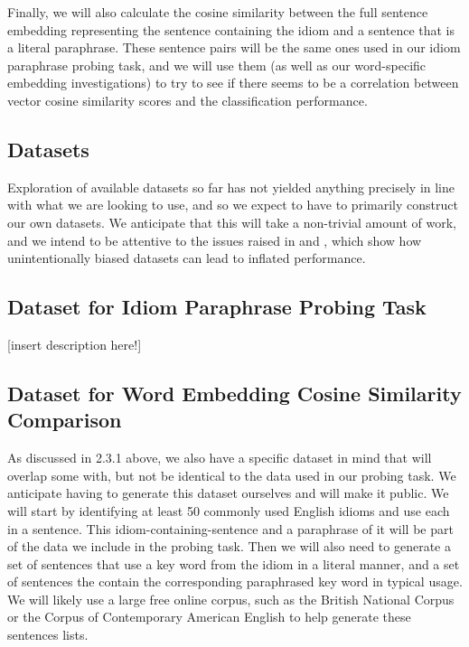 \documentclass[11pt,a4paper]{article}
\begin{document}
 Finally, we will also calculate the cosine similarity between the full sentence embedding representing the sentence containing the idiom and a sentence that is a literal paraphrase. These sentence pairs will be the same ones used in our idiom paraphrase probing task, and we will use them (as well as our word-specific embedding investigations) to try to see if there seems to be a correlation between vector cosine similarity scores and the classification performance.

\subsection{Datasets}
Exploration of available datasets so far has not yielded anything precisely in line with what we are looking to use, and so we expect to have to primarily construct our own datasets. We anticipate that this will take a non-trivial amount of work, and we intend to be attentive to the issues raised in \citep{niven2019probing} and \citep{mccoy2019right}, which show how unintentionally biased datasets can lead to inflated performance.

\subsection{Dataset for Idiom Paraphrase Probing Task}
\vspace{5mm}
[insert description here!]

\vspace{15mm}


\subsection{Dataset for Word Embedding Cosine Similarity Comparison}
As discussed in 2.3.1 above, we also have a specific dataset in mind that will overlap some with, but not be identical to the data used in our probing task. We anticipate having to generate this dataset ourselves and will make it public. We will start by identifying at least 50 commonly used English idioms and use each in a sentence. This idiom-containing-sentence and a paraphrase of it will be part of the data we include in the probing task. Then we will also need to generate a set of sentences that use a key word from the idiom in a literal manner, and a set of sentences the contain the corresponding paraphrased key word in typical usage. We will likely use a large free online corpus, such as the British National Corpus or the Corpus of Contemporary American English to help generate these sentences lists.
\end{document}
